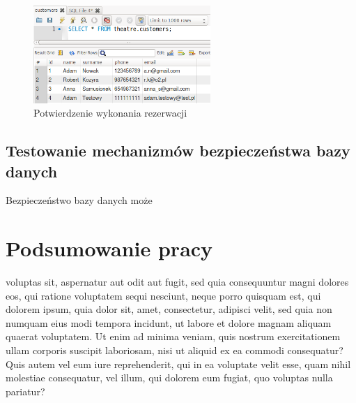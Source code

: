 \documentclass{mgr}
\begin{document}
\begin{figure}[!ht]
	\centering
	\includegraphics[width=0.6\textwidth]{images/app_db_show_clients.png}
	\caption{Potwierdzenie wykonania rezerwacji}
	\label{fig:app-db-show-clients}
\end{figure}


\section{Testowanie mechanizmów bezpieczeństwa bazy danych}
Bezpieczeństwo bazy danych może 

\chapter{Podsumowanie pracy}
voluptas sit, aspernatur aut odit aut fugit, sed quia consequuntur magni dolores eos, qui ratione voluptatem sequi nesciunt, neque porro quisquam est, qui dolorem ipsum, quia dolor sit, amet, consectetur, adipisci velit, sed quia non numquam eius modi tempora incidunt, ut labore et dolore magnam aliquam quaerat voluptatem. Ut enim ad minima veniam, quis nostrum exercitationem ullam corporis suscipit laboriosam, nisi ut aliquid ex ea commodi consequatur? Quis autem vel eum iure reprehenderit, qui in ea voluptate velit esse, quam nihil molestiae consequatur, vel illum, qui dolorem eum fugiat, quo voluptas nulla pariatur?
\end{document}
